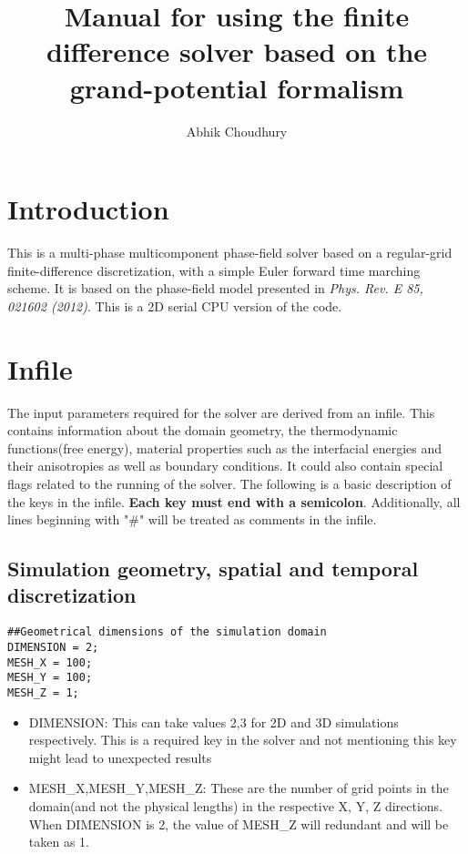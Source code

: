 \documentclass[a4paper,10pt]{article}
\title{Manual for using the finite difference solver based on the grand-potential formalism}
\author{Abhik Choudhury}
\begin{document}
\maketitle

\section{Introduction}
This is a multi-phase multicomponent phase-field solver based on a
regular-grid finite-difference discretization, with a
simple Euler forward time marching scheme. It is based on the 
phase-field model presented in \textit{Phys. Rev. E 85, 021602 (2012)}.
This is a 2D serial CPU version of the code.

\section{Infile}
The input parameters required for the solver are derived from an 
infile. This contains information about the domain geometry, 
the thermodynamic functions(free energy), material properties 
such as the interfacial energies and their anisotropies 
as well as boundary conditions. It could also contain special
flags related to the running of the solver. The following is a basic 
description of the keys in the infile. \textbf{Each key must end with 
a semicolon}. Additionally, all lines beginning with "\#" will be treated
as comments in the infile.


\subsection{Simulation geometry, spatial and temporal discretization}

\begin{lstlisting}
##Geometrical dimensions of the simulation domain
DIMENSION = 2;
MESH_X = 100;
MESH_Y = 100;
MESH_Z = 1;
\end{lstlisting}

\begin{itemize}
\item DIMENSION: This can take values 2,3 for 2D and 3D simulations respectively. This is a required key in the solver and not mentioning this key might lead to unexpected results
\item MESH\_X,MESH\_Y,MESH\_Z: These are the number of grid points in the domain(and not the physical lengths) in the respective X, Y, Z directions. 
When DIMENSION is 2, the value of MESH\_Z will redundant and will be taken as 1.
\end{itemize}
\end{document}
